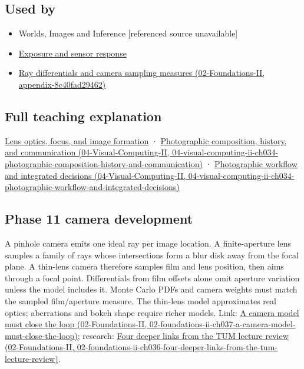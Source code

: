 \subsection{Used by}\label{appendix-21f8456e2629-used-by}

\begin{itemize}
\item
  {Worlds, Images and Inference {[}referenced source unavailable{]}}
\item
  \hyperref[appendix-92d45cdf2afc]{Exposure and sensor response}
\item
  \href{../02-Foundations-II/main.pdf\#nameddest=appendix-8c40fad29462}{Ray differentials and camera sampling measures (02-Foundations-II, appendix-8c40fad29462)}
\end{itemize}

\subsection{Full teaching explanation}\label{appendix-21f8456e2629-full-teaching-explanation}

\hyperref[03-visual-computing-i-ch003-lens-optics-focus-and-image-formation]{Lens optics, focus, and image formation} · \href{../04-Visual-Computing-II/main.pdf\#nameddest=04-visual-computing-ii-ch034-photographic-composition-history-and-communication}{Photographic composition, history, and communication (04-Visual-Computing-II, 04-visual-computing-ii-ch034-photographic-composition-history-and-communication)} · \href{../04-Visual-Computing-II/main.pdf\#nameddest=04-visual-computing-ii-ch034-photographic-workflow-and-integrated-decisions}{Photographic workflow and integrated decisions (04-Visual-Computing-II, 04-visual-computing-ii-ch034-photographic-workflow-and-integrated-decisions)}

\subsection{Phase 11 camera development}\label{appendix-21f8456e2629-phase-11-camera-development}

A pinhole camera emits one ideal ray per image location. A finite-aperture lens samples a family of rays whose intersections form a blur disk away from the focal plane. A thin-lens camera therefore samples film and lens position, then aims through a focal point. Differentials from film offsets alone omit aperture variation unless the model includes it. Monte Carlo PDFs and camera weights must match the sampled film/aperture measure. The thin-lens model approximates real optics; aberrations and bokeh shape require richer models. Link: \href{../02-Foundations-II/main.pdf\#nameddest=02-foundations-ii-ch037-a-camera-model-must-close-the-loop}{A camera model must close the loop (02-Foundations-II, 02-foundations-ii-ch037-a-camera-model-must-close-the-loop)}; research: \href{../02-Foundations-II/main.pdf\#nameddest=02-foundations-ii-ch036-four-deeper-links-from-the-tum-lecture-review}{Four deeper links from the TUM lecture review (02-Foundations-II, 02-foundations-ii-ch036-four-deeper-links-from-the-tum-lecture-review)}.
